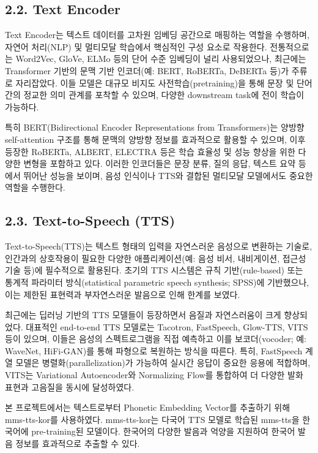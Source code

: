 \documentclass[letterpaper]{article} %
\begin{document}
\subsection{2.2. Text Encoder}
Text Encoder는 텍스트 데이터를 고차원 임베딩 공간으로 매핑하는 역할을 수행하며, 자연어 처리(NLP) 및 멀티모달 학습에서 핵심적인 구성 요소로 작용한다. 전통적으로는 Word2Vec, GloVe, ELMo 등의 단어 수준 임베딩이 널리 사용되었으나, 최근에는 Transformer 기반의 문맥 기반 인코더(예: BERT, RoBERTa, DeBERTa 등)가 주류로 자리잡았다. 이들 모델은 대규모 비지도 사전학습(pretraining)을 통해 문장 및 단어 간의 정교한 의미 관계를 포착할 수 있으며, 다양한 downstream task에 전이 학습이 가능하다.

특히 BERT(Bidirectional Encoder Representations from Transformers)는 양방향 self-attention 구조를 통해 문맥의 양방향 정보를 효과적으로 활용할 수 있으며, 이후 등장한 RoBERTa, ALBERT, ELECTRA 등은 학습 효율성 및 성능 향상을 위한 다양한 변형을 포함하고 있다. 이러한 인코더들은 문장 분류, 질의 응답, 텍스트 요약 등에서 뛰어난 성능을 보이며, 음성 인식이나 TTS와 결합된 멀티모달 모델에서도 중요한 역할을 수행한다.


\subsection{2.3. Text-to-Speech (TTS)}
Text-to-Speech(TTS)는 텍스트 형태의 입력을 자연스러운 음성으로 변환하는 기술로, 인간과의 상호작용이 필요한 다양한 애플리케이션(예: 음성 비서, 내비게이션, 접근성 기술 등)에 필수적으로 활용된다. 초기의 TTS 시스템은 규칙 기반(rule-based) 또는 통계적 파라미터 방식(statistical parametric speech synthesis; SPSS)에 기반했으나, 이는 제한된 표현력과 부자연스러운 발음으로 인해 한계를 보였다.

최근에는 딥러닝 기반의 TTS 모델들이 등장하면서 음질과 자연스러움이 크게 향상되었다. 대표적인 end-to-end TTS 모델로는 Tacotron, FastSpeech, Glow-TTS, VITS 등이 있으며, 이들은 음성의 스펙트로그램을 직접 예측하고 이를 보코더(vocoder; 예: WaveNet, HiFi-GAN)를 통해 파형으로 복원하는 방식을 따른다. 특히, FastSpeech 계열 모델은 병렬화(parallelization)가 가능하여 실시간 응답이 중요한 응용에 적합하며, VITS는 Variational Autoencoder와 Normalizing Flow를 통합하여 더 다양한 발화 표현과 고음질을 동시에 달성하였다.

본 프로젝트에서는 텍스트로부터 Phonetic Embedding Vector를 추출하기 위해 mms-tts-kor\cite{pratap2023mms}를 사용하였다. mms-tts-kor는 다국어 TTS 모델로 학습된 mms-tts을 한국어에 pre-training된 모델이다. 한국어의 다양한 발음과 억양을 지원하여 한국어 발음 정보를 효과적으로 추출할 수 있다.
\end{document}
